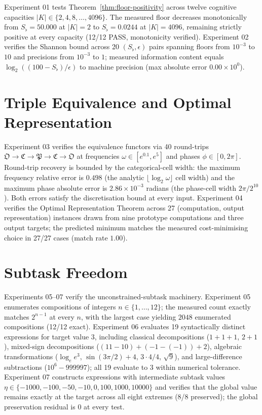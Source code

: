 \documentclass[twocolumn,a4paper]{article}
\newcommand{\Sfloor}{S_{\flat}}
\newcommand{\OOsc}{\mathfrak{O}}
\newcommand{\CCat}{\mathfrak{C}}
\newcommand{\PPart}{\mathfrak{P}}
\begin{document}
Experiment 01 tests Theorem~\ref{thm:floor-positivity} across twelve cognitive capacities $|K|\in\{2,4,8,\ldots,4096\}$. The measured floor decreases monotonically from $\Sfloor=50.000$ at $|K|=2$ to $\Sfloor=0.0244$ at $|K|=4096$, remaining strictly positive at every capacity (12/12 PASS, monotonicity verified). Experiment 02 verifies the Shannon bound across 20 $(\Sfloor,\epsilon)$ pairs spanning floors from $10^{-3}$ to $10$ and precisions from $10^{-3}$ to $1$; measured information content equals $\log_{2}((100-\Sfloor)/\epsilon)$ to machine precision (max absolute error $0.00 \times 10^{0}$).

\section{Triple Equivalence and Optimal Representation}

Experiment 03 verifies the equivalence functors via 40 round-trips $\OOsc\to\CCat\to\PPart\to\CCat\to\OOsc$ at frequencies $\omega\in[e^{0.1},e^{5}]$ and phases $\phi\in[0,2\pi]$. Round-trip recovery is bounded by the categorical-cell width: the maximum frequency relative error is $0.498$ (the analytic $\lfloor\log_{2}\omega\rfloor$ cell width) and the maximum phase absolute error is $2.86\times 10^{-3}$ radians (the phase-cell width $2\pi/2^{10}$). Both errors satisfy the discretisation bound at every input. Experiment 04 verifies the Optimal Representation Theorem across 27 (computation, output representation) instances drawn from nine prototype computations and three output targets; the predicted minimum matches the measured cost-minimising choice in 27/27 cases (match rate $1.00$).

\section{Subtask Freedom}

Experiments 05--07 verify the unconstrained-subtask machinery. Experiment 05 enumerates compositions of integers $n\in\{1,\ldots,12\}$; the measured count exactly matches $2^{n-1}$ at every $n$, with the largest case yielding $2048$ enumerated compositions (12/12 exact). Experiment 06 evaluates 19 syntactically distinct expressions for target value $3$, including classical decompositions ($1{+}1{+}1$, $2{+}1$), mixed-sign decompositions ($(11{-}10) + (-1{-}({-}1)) + 2$), algebraic transformations ($\log_{e}e^{3}$, $\sin(3\pi/2)+4$, $3 \cdot 4 / 4$, $\sqrt{9}$), and large-difference subtractions ($10^{6} - 999997$); all 19 evaluate to $3$ within numerical tolerance. Experiment 07 constructs expressions with intermediate subtask values $\eta \in \{-1000, -100, -50, -10, 0, 100, 1000, 10000\}$ and verifies that the global value remains exactly at the target across all eight extremes (8/8 preserved); the global preservation residual is $0$ at every test.
\end{document}
